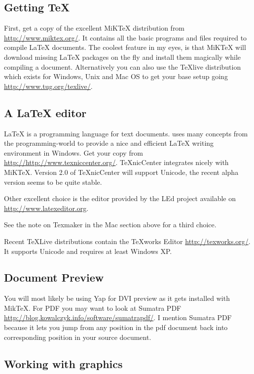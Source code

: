 \subsection{Getting \TeX{}}

First, get a copy of the excellent MiK\TeX{} distribution from\\
\url{http://www.miktex.org/}. It contains all the basic programs and files
required to compile \LaTeX{} documents.  The coolest feature in my eyes, is
that MiKTeX will download missing \LaTeX{} packages on the fly and install them
magically while compiling a document. Alternatively you can also use
the TeXlive distribution which exists for Windows, Unix and Mac OS to
get your base setup going \url{http://www.tug.org/texlive/}.

\subsection{A \LaTeX{} editor}

\LaTeX{} is a programming language for text documents. 
uses many concepts from the programming-world to provide a nice and
efficient \LaTeX{} writing environment in Windows. Get your copy from\\
\url{http://http://www.texniccenter.org/}. TeXnicCenter integrates nicely with
MiKTeX. Version 2.0 of TeXnicCenter will support Unicode, the recent alpha version
seems to be quite stable.

Other excellent choice is the editor provided by the LEd project available
on \url{http://www.latexeditor.org}.

See the note on Texmaker in the Mac section above for a third choice.

Recent \TeX Live distributions contain the \TeX{}works Editor
\url{http://texworks.org/}. It supports Unicode and requires at least Windows XP.

\subsection{Document Preview}

You will most likely be using Yap for DVI preview as it gets installed with
MikTeX. For PDF you may want to look at Sumatra
PDF \url{http://blog.kowalczyk.info/software/sumatrapdf/}. I mention Sumatra PDF
because it lets you jump from any position in the pdf document back into
corresponding position in your source document.

\subsection{Working with graphics}

